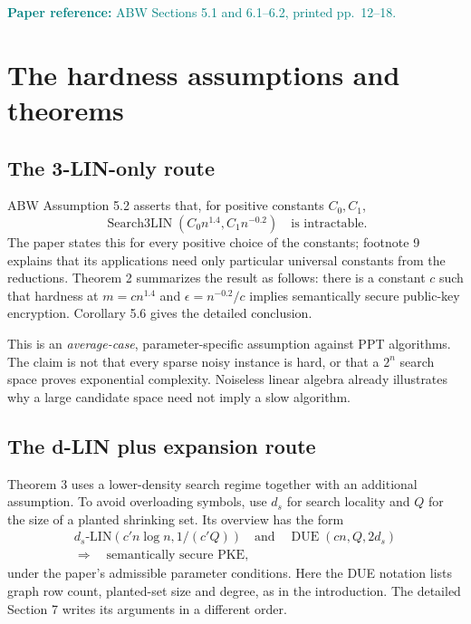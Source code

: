 \documentclass[11pt,a4paper]{article}
\newcommand{\Search}{\operatorname{Search3LIN}}
\newcommand{\readref}[1]{\textcolor{teal}{\small\textbf{Paper reference:} #1}}
\begin{document}
\readref{ABW Sections 5.1 and 6.1--6.2, printed pp.~12--18.}

\section{The hardness assumptions and theorems}\label{sec:assumptions}
\subsection{The 3-LIN-only route}
ABW Assumption 5.2 asserts that, for positive constants $C_0,C_1$,
\begin{equation}
 \Search(C_0 n^{1.4},C_1 n^{-0.2})\quad\text{is intractable.}\label{eq:assumption}
\end{equation}
The paper states this for every positive choice of the constants; footnote 9 explains that its applications need only particular universal constants from the reductions. Theorem 2 summarizes the result as follows: there is a constant $c$ such that hardness at $m=cn^{1.4}$ and $\epsilon=n^{-0.2}/c$ implies semantically secure public-key encryption. Corollary 5.6 gives the detailed conclusion.

This is an \emph{average-case}, parameter-specific assumption against PPT algorithms. The claim is not that every sparse noisy instance is hard, or that a $2^n$ search space proves exponential complexity. Noiseless linear algebra already illustrates why a large candidate space need not imply a slow algorithm.

\subsection{The d-LIN plus expansion route}
Theorem 3 uses a lower-density search regime together with an additional assumption. To avoid overloading symbols, use $d_s$ for search locality and $Q$ for the size of a planted shrinking set. Its overview has the form
\begin{equation}
 \begin{gathered}
 d_s\text{-LIN}(c'n\log n,1/(c'Q))\quad\text{and}\quad
 \operatorname{DUE}(cn,Q,2d_s)\\
 \Longrightarrow\quad\text{semantically secure PKE},
 \end{gathered}\label{eq:dueoverview}
\end{equation}
under the paper's admissible parameter conditions. Here the DUE notation lists graph row count, planted-set size and degree, as in the introduction. The detailed Section 7 writes its arguments in a different order.
\end{document}
